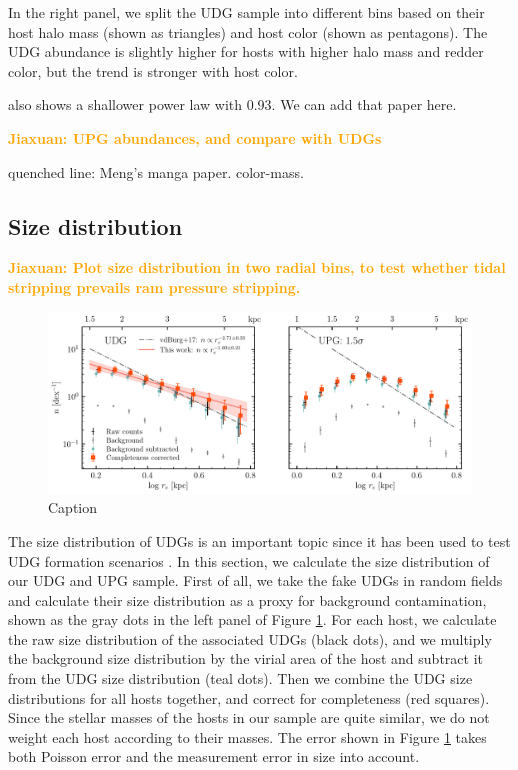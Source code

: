 \documentclass[twocolumn,astrosymb,twocolappendix]{aastex631}
\newcommand{\jiaxuan}[1]{\textcolor{orange}{\textbf{Jiaxuan: #1}}}
\begin{document}
\begin{CJK*}{UTF8}{gbsn}
In the right panel, we split the UDG sample into different bins based on their host halo mass (shown as triangles) and host color (shown as pentagons). The UDG abundance is slightly higher for hosts with higher halo mass and redder color, but the trend is stronger with host color. 

\citet{Liao2019} also shows a shallower power law with 0.93. We can add that paper here. 

\jiaxuan{UPG abundances, and compare with UDGs}

quenched line: Meng's manga paper. color-mass. 


\subsection{Size distribution}\label{sec:size_distr}
\jiaxuan{Plot size distribution in two radial bins, to test whether tidal stripping prevails ram pressure stripping. }
\begin{figure}
	\vbox{ 
		\centering
		\includegraphics[width=1\linewidth]{size_distribution.pdf}
	}
    \caption{Caption}
    \label{fig:size_distribution}
\end{figure}

The size distribution of UDGs is an important topic since it has been used to test UDG formation scenarios \citep[e.g.,][]{Amorisco2016,vdBurg2017}. In this section, we calculate the size distribution of our UDG and UPG sample. First of all, we take the fake UDGs in random fields and calculate their size distribution as a proxy for background contamination, shown as the gray dots in the left panel of Figure \ref{fig:size_distribution}. For each host, we calculate the raw size distribution of the associated UDGs (black dots), and we multiply the background size distribution by the virial area of the host and subtract it from the UDG size distribution (teal dots). Then we combine the UDG size distributions for all hosts together, and correct for completeness (red squares). Since the stellar masses of the hosts in our sample are quite similar, we do not weight each host according to their masses. The error shown in Figure \ref{fig:size_distribution} takes both Poisson error and the measurement error in size into account.


\end{CJK*}
\end{document}
